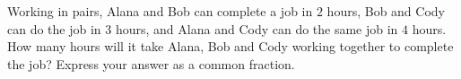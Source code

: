Working in pairs, Alana and Bob can complete a job in $2$ hours, Bob and Cody can do the job in $3$ hours, and Alana and Cody can do the same job in $4$ hours. How many hours will it take Alana, Bob and Cody working together to complete the job? Express your answer as a common fraction.

